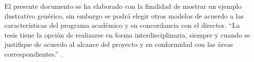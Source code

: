 
El presente documento se ha elaborado con la finalidad de mostrar un ejemplo ilustrativo genérico, sin embargo se podrá elegir otros modelos de acuerdo a las características del programa académico y en concordancia con el director.
“La tesis tiene la opción de realizarse en forma interdisciplinaria, siempre y cuando se justifique de acuerdo al alcance del proyecto y en conformidad con las áreas correspondientes.” \cite{einstein}. 
